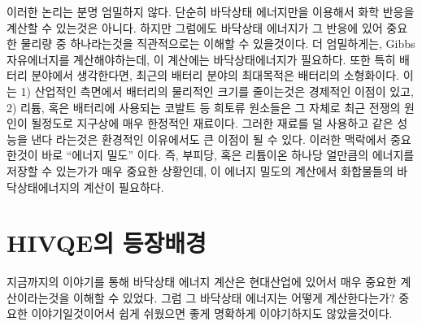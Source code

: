 \documentclass[10pt]{article}
\begin{document}
이러한 논리는 분명 엄밀하지 않다. 단순히 바닥상태 에너지만을 이용해서 화학 반응을 계산할 수 있는것은 아니다. 
하지만 그럼에도 바닥상태 에너지가 그 반응에 있어 중요한 물리량 중 하나라는것을 직관적으로는 이해할 수 있을것이다. 
더 엄밀하게는, Gibbs 자유에너지를 계산해야하는데, 이 계산에는 바닥상태에너지가 필요하다. 
또한 특히 배터리 분야에서 생각한다면, 최근의 배터리 분야의 최대목적은 배터리의 소형화이다. 
이는 1) 산업적인 측면에서 배터리의 물리적인 크기를 줄이는것은 경제적인 이점이 있고, 
2) 리튬, 혹은 배터리에 사용되는 코발트 등 희토류 원소들은 그 자체로 최근 전쟁의 원인이 될정도로 지구상에 매우 한정적인 재료이다. 
그러한 재료를 덜 사용하고 같은 성능을 낸다 라는것은 환경적인 이유에서도 큰 이점이 될 수 있다. 
이러한 맥락에서 중요한것이 바로 “에너지 밀도” 이다. 즉, 부피당, 혹은 리튬이온 하나당 얼만큼의 에너지를 저장할 수 있는가가 매우 중요한 상황인데,
 이 에너지 밀도의 계산에서 화합물들의 바닥상태에너지의 계산이 필요하다.


\section*{HIVQE의 등장배경}


지금까지의 이야기를 통해 바닥상태 에너지 계산은 현대산업에 있어서 매우 중요한 계산이라는것을 이해할 수 있었다. 그럼 그 바닥상태 에너지는 어떻게 계산한다는가? 중요한 이야기일것이어서 쉽게 쉬웠으면 좋게 명확하게 이야기하지도 않았을것이다.
\end{document}
